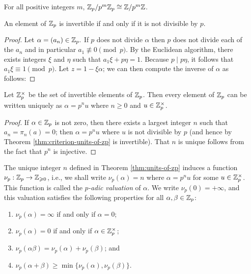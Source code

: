 \begin{corollary}
    For all positive integers \(m\), \(\mathbb{Z}_p / p^m \mathbb{Z}_p \cong \mathbb{Z} / p^m \mathbb{Z}\).
\end{corollary}

\begin{theoremx}\label{thm:criterion-units-of-zp}
    An element of \(\mathbb{Z}_p\) is invertible if and only if it is not divisible by \(p\).
\end{theoremx}

\begin{proof}
    Let \(\alpha = (a_n) \in \mathbb{Z}_p.\) If \(p\) does not divide \(\alpha\) then \(p\) does not divide each of the \(a_n\) and in particular \(a_1 \not\equiv 0 \pmod{p}\). By the Euclidean algorithm, there exists integers \(\xi\) and \(\eta\) such that \(a_1\xi + p\eta = 1\). Because \(p \mid p\eta\), it follows that \(a_1\xi \equiv 1 \pmod{p}\). Let \(z = 1 - \xi\alpha\); we can then compute the inverse of \(\alpha\) as follows:
\end{proof}

\begin{theoremx}\label{thm:units-of-zp}
    Let \(\mathbb{Z}_p^{\times}\) be the set of invertible elements of \(\mathbb{Z}_p\). Then every element of \(\mathbb{Z}_p\) can be written uniquely as \(\alpha = p^nu\) where \(n \geq 0\) and \(u \in \mathbb{Z}_p^{\times}\).
\end{theoremx}

\begin{proof}
    If \(\alpha \in \mathbb{Z}_p\) is not zero, then there exists a largest integer \(n\) such that \(a_n = \pi_n(a) = 0\); then \(\alpha = p^nu\) where \(u\) is not divisible by \(p\) (and hence by Theorem \ref{thm:criterion-units-of-zp} is invertible). That \(n\) is unique follows from the fact that \(p^n\) is injective.
\end{proof}

\smallskip

The unique integer \(n\) defined in Theorem \ref{thm:units-of-zp} induces a function \(\nu_p : \mathbb{Z}_p \to \mathbb{Z}_{\geqslant 0}\), i.e., we shall write \(\nu_p(\alpha) = n\) where \(\alpha = p^nu\) for some \(u \in \mathbb{Z}_p^{\times}\). This function is called the \emph{\(p\)-adic valuation} of \(\alpha\). We write \(\nu_p(0) = +\infty\), and this valuation satisfies the following properties for all \(\alpha, \beta \in \mathbb{Z}_p\):

\smallskip

\begin{enumerate}[nosep, label=(\roman*)]
    \item \(\nu_p(\alpha) =\infty\) if and only if \(\alpha = 0\);\label{item:padic-valuation-zero}
    \item \(\nu_p(\alpha) = 0\) if and only if \(\alpha \in \mathbb{Z}_p^{\times}\);\label{item:padic-valuation-units}
    \item \(\nu_p(\alpha\beta) = \nu_p(\alpha) + \nu_p(\beta)\); and\label{item:padic-valuation-product}
    \item \(\nu_p(\alpha + \beta) \geq \min\{\nu_p(\alpha), \nu_p(\beta)\}\).
    \label{item:padic-valuation-sum}
\end{enumerate}

